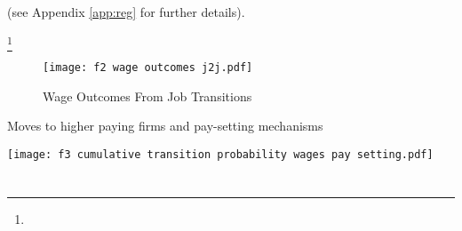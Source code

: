 \documentclass[11pt,twocolumn,openany,leqno]{e61-research-note}
\begin{document}
\lipsum[1] (see Appendix \ref{app:reg} for further details).

\lipsum[2]\footnote{\lipsum[][1-4]}

\lipsum[3]

\begin{figure}[htb]
\caption{Wage Outcomes From Job Transitions}\label{fig:stp-wages}
\texttt{[image: f2 wage outcomes j2j.pdf]}
\end{figure}

\newpage

\begin{Boxx}[label=box-pay]{Moves to higher paying firms and pay-setting mechanisms}
\setlength{\parskip}{\baselineskip}

\lipsum[8-12]

\begin{minipage}{\textwidth}
  \label{fig:award-trans}
  \texttt{[image: f3 cumulative transition probability wages pay setting.pdf]}
\end{minipage}

\end{Boxx}

\chapter{\lipsum[][10]}

\lipsum[1-6]

\printbibliography[title={References}]
\end{document}
